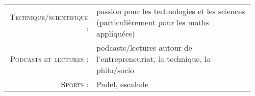 %
%
%

\begin{tabular}{rl}
    \textsc{Technique/scientifique :} & passion pour les technologies et les sciences (particulièrement pour les maths appliquées)\\
    \textsc{Podcasts et lectures :} & podcasts/lectures autour de l'entrepreneuriat, la technique, la philo/socio  \\ 
    \textsc{Sports :} & Padel, escalade \\
\end{tabular}